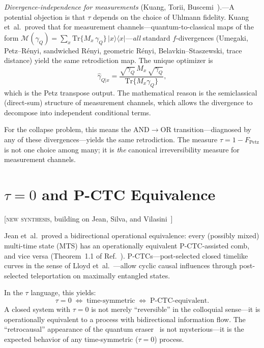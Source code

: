 \documentclass[prl,twocolumn,superscriptaddress,longbibliography,floatfix]{revtex4-2}
\newcommand{\Tr}{\mathrm{Tr}}
\newcommand{\op}[2]{|#1\rangle\langle#2|}
\newcommand{\tauasym}{\tau}
\begin{document}
\emph{Divergence-independence for measurements}
(Kuang, Torii, Buscemi~\cite{Kuang2025}).---A potential objection is
that $\tauasym$ depends on the choice of Uhlmann fidelity.  Kuang
et~al.\ proved that for measurement channels---quantum-to-classical
maps of the form
$\mathcal{M}(\gamma_Q) = \sum_x \Tr\{M_x\, \gamma_Q\}\, \op{x}{x}$---\emph{all} standard $f$-divergences (Umegaki,
Petz--R\'{e}nyi, sandwiched R\'{e}nyi, geometric R\'{e}nyi,
Belavkin--Staszewski, trace distance) yield the same retrodiction
map.  The unique optimizer is
\begin{equation}
\hat{\gamma}_{Q|x} = \frac{\sqrt{\gamma_Q}\, M_x\, \sqrt{\gamma_Q}}
{\Tr\{M_x \gamma_Q\}},
\label{eq:kuang_retrodiction}
\end{equation}
which is the Petz transpose output.  The mathematical reason is the
semiclassical (direct-sum) structure of measurement channels, which
allows the divergence to decompose into independent conditional terms.

For the collapse problem, this means the AND$\to$OR
transition---diagnosed by any of these divergences---yields the same
retrodiction.  The measure $\tauasym = 1 - F_{\mathrm{Petz}}$ is not
one choice among many; it is \emph{the} canonical irreversibility
measure for measurement channels.

\section{$\tauasym = 0$ and P-CTC Equivalence}
\label{sec:pctc}

[\textsc{new synthesis}, building on Jean, Silva, and
Vilasini~\cite{Jean2025}]

Jean et~al.\ proved a bidirectional operational equivalence: every
(possibly mixed) multi-time state (MTS) has an operationally
equivalent P-CTC-assisted comb, and vice versa (Theorem~1.1 of
Ref.~\cite{Jean2025}).  P-CTCs---post-selected closed timelike curves
in the sense of Lloyd et~al.~\cite{Lloyd2011}---allow cyclic causal
influences through post-selected teleportation on maximally entangled
states.

In the $\tauasym$ language, this yields:
\begin{equation}
\tauasym = 0 \;\Longleftrightarrow\; \text{time-symmetric}
\;\Longleftrightarrow\; \text{P-CTC-equivalent}.
\label{eq:pctc_equiv}
\end{equation}
A closed system with $\tauasym = 0$ is not merely ``reversible'' in
the colloquial sense---it is operationally equivalent to a process
with bidirectional information flow.  The ``retrocausal'' appearance
of the quantum eraser~\cite{Scully1982,Kim2000} is not
mysterious---it is the expected behavior of any time-symmetric
($\tauasym = 0$) process.
\end{document}
